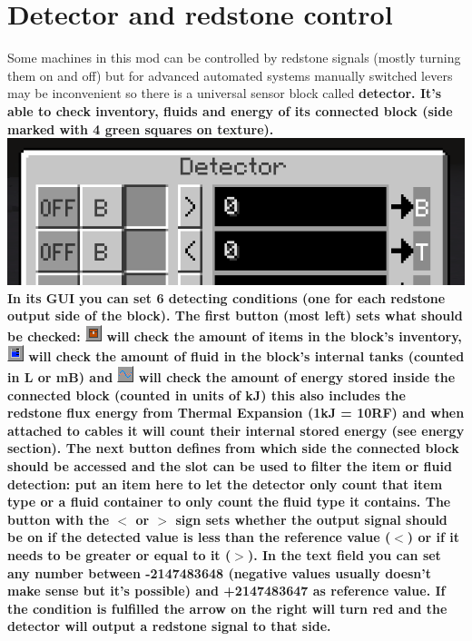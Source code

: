 \documentclass[11pt]{article} %
\begin{document}
\section{Detector and redstone control}
Some machines in this mod can be controlled by redstone signals (mostly turning them on and off) but for advanced automated systems manually switched levers may be inconvenient so there is a universal sensor block called \bf detector\rm . It's able to check inventory, fluids and energy of its connected block (side marked with 4 green squares on texture). \\
\includegraphics[width = \textwidth]{detector} \\
In its GUI you can set 6 detecting conditions (one for each redstone output side of the block). The first button (most left) sets what should be checked: \includegraphics{detectItem} will check the amount of items in the block's inventory, \includegraphics{detectFluid} will check the amount of fluid in the block's internal tanks (counted in L or mB) and \includegraphics{detectEnergy} will check the amount of energy stored inside the connected block (counted in units of kJ) this also includes the redstone flux energy from Thermal Expansion (1kJ = 10RF) and when attached to cables it will count their internal stored energy (see energy section). The next button defines from which side the connected block should be accessed and the slot can be used to filter the item or fluid detection: put an item here to let the detector only count that item type or a fluid container to only count the fluid type it contains. The button with the $<$ or $>$ sign sets whether the output signal should be on if the detected value is less than the reference value ($<$) or if it needs to be greater or equal to it ($>$). In the text field you can set any number between -2147483648 (negative values usually doesn't make sense but it's possible) and +2147483647 as reference value. If the condition is fulfilled the arrow on the right will turn red and the detector will output a redstone signal to that side.
\end{document}
